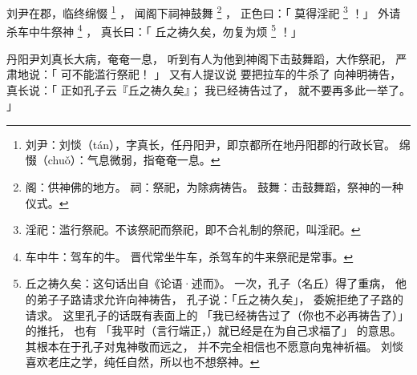 
\switchcolumn*[\section{}]

刘尹在郡，临终绵惙%
\footnote{%
    刘尹：刘惔（tán），字真长，任丹阳尹，即京都所在地丹阳郡的行政长官。
    绵惙（chuǒ）：气息微弱，指奄奄一息。
}%
，
闻阁下祠神鼓舞%
\footnote{%
    阁：供神佛的地方。
    祠：祭祀，为除病祷告。
    鼓舞：击鼓舞蹈，祭神的一种仪式。
}%
，
正色曰：「
    莫得淫祀%
    \footnote{%
        淫祀：滥行祭祀。不该祭祀而祭祀，即不合礼制的祭祀，叫淫祀。
    }%
！」
外请杀车中牛祭神%
\footnote{%
    车中牛：驾车的牛。
            晋代常坐牛车，杀驾车的牛来祭祀是常事。
}%
，
真长曰：「
    丘之祷久矣，勿复为烦%
    \footnote{%
        丘之祷久矣：这句话出自《论语·述而》。
                    一次，孔子（名丘）得了重病，
                    他的弟子子路请求允许向神祷告，
                    孔子说：「丘之祷久矣」，
                    委婉拒绝了子路的请求。
                    这里孔子的话既有表面上的
                    「我已经祷告过了（你也不必再祷告了）」
                    的推托，
                    也有
                    「我平时（言行端正，）就已经是在为自己求福了」
                    的意思。
                    其根本在于孔子对鬼神敬而远之，
                    并不完全相信也不愿意向鬼神祈福。
                    刘惔喜欢老庄之学，纯任自然，所以也不想祭神。
    }%
！」

\switchcolumn

丹阳尹刘真长大病，奄奄一息，
听到有人为他到神阁下击鼓舞蹈，大作祭祀，
严肃地说：「
    可不能滥行祭祀！
」
又有人提议说
要把拉车的牛杀了
向神明祷告，
真长说：「
    正如孔子云『丘之祷久矣』；
    我已经祷告过了，
    就不要再多此一举了。
」

